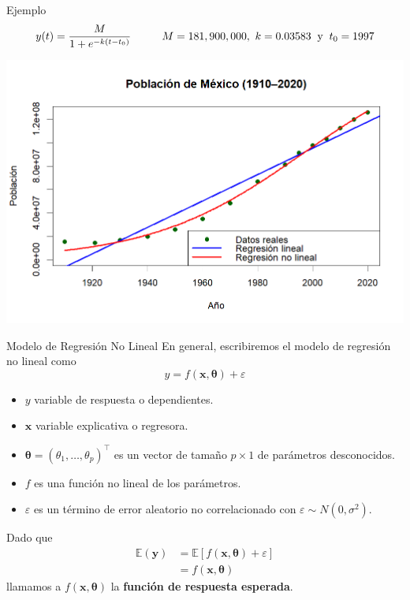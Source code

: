 \documentclass[aspectratio = 169, spanish]{beamer}
\begin{document}
\begin{frame}{Ejemplo}
    \begin{align*}
        y(t) = \frac{M}{1 + e^{-k(t - t_0)}}\hspace{1cm} M = 181,900,000, \ k=0.03583 \hspace{0.2cm}\text{y}\hspace{0.2cm}t_0 = 1997
    \end{align*}
    \begin{center}
        \includegraphics[scale=0.6]{logis1.png}
    \end{center}
    
\end{frame}

\begin{frame}{Modelo de Regresión No Lineal}
En general, escribiremos el modelo de regresión no lineal como
\[
    y = f\left(\bm{x}, \boldsymbol{\theta}\right) + \varepsilon
\]
\begin{itemize}
    \item $y$ variable de respuesta o dependientes.
    \item $\bm{x}$ variable explicativa o regresora.
    \item \(\boldsymbol{\theta} = (\theta_1, \ldots, \theta_p)^\top\) es un vector de tamaño \(p \times 1\) de parámetros desconocidos.
    \item $f$ es una función no lineal de los parámetros.
    \item  \(\varepsilon\) es un término de error aleatorio no correlacionado con $\varepsilon \sim N(0, \sigma^2)$.
\end{itemize}
Dado que
\begin{align*}
    \mathbb E\left(\bm{y}\right) &= \mathbb E\left[f\left(\bm{x}, \boldsymbol{\theta}\right) + \varepsilon\right]\\
&= f\left(\bm{x}, \boldsymbol{\theta}\right)
\end{align*}
llamamos a \(f(\bm{x}, \boldsymbol{\theta})\) la \textbf{función de respuesta esperada}.
\end{frame}
\end{document}
